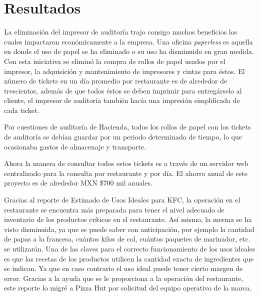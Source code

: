 
\chapter{Resultados}
\label{chap:resultados}


La eliminación del impresor de auditoría trajo consigo muchos beneficios los cuales impactaron económicamente a la empresa. Una oficina \textit{paperless} es aquella en donde el uso de papel se ha eliminado o su uso ha disminuido en gran medida. Con esta iniciativa se eliminó la compra de rollos de papel usados por el impresor, la adquisición y mantenimiento de impresores y cintas para éstos. El número de tickets en un día promedio por restaurante es de alrededor de trescientos, además de que todos éstos se deben imprimir para entregárselo al cliente, el impresor de auditoría también hacía una impresión simplificada de cada ticket.

Por cuestiones de auditoría de Hacienda, todos los rollos de papel con los tickets de auditoría se debían guardar por un periodo determinado de tiempo, lo que ocasionaba gastos de almacenaje y transporte.

Ahora la manera de consultar todos estos tickets es a través de un servidor web centralizado para la consulta por restaurante y por día. El ahorro anual de este proyecto es de alrededor MXN \$700 mil anuales.


Gracias al reporte de Estimado de Usos Ideales para KFC, la operación en el restaurante se encuentra más preparada para tener el nivel adecuado de inventario de los productos críticos en el restaurante. Así mismo, la merma se ha visto disminuida, ya que se puede saber con anticipación, por ejemplo la cantidad de papas a la francesa, cuántos kilos de col, cuántos paquetes de marinador, etc. se utilizarán. Una de las claves para el correcto funcionamiento de los usos ideales es que las recetas de los productos utilicen la cantidad exacta de ingredientes que se indican. Ya que en caso contrario el uso ideal puede tener cierto margen de error. Gracias a la ayuda que se le proporciona a la operación del restaurante, este reporte lo migré a Pizza Hut por solicitud del equipo operativo de la marca.

